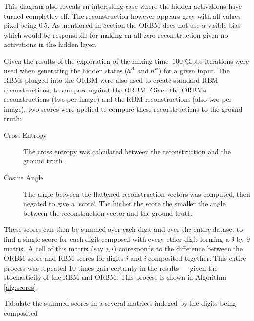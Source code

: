   This diagram also reveals an interesting case where the hidden activations have turned completley off. The reconstruction however appears grey with all values pixel being $0.5$. As mentioned in Section  the ORBM does not use a visible bias which would be responsibile for making an all zero reconstruction given no activations in the hidden layer.


  Given the results of the exploration of the mixing time, 100 Gibbs iterations were used when generating the hidden states ($h^A$ and $h^B$) for a given input. The RBMs plugged into the ORBM were also used to create standard RBM reconstructions, to compare against the ORBM. Given the ORBMs reconstructions (two per image) and the RBM reconstructions (also two per image), two scores were applied to compare these reconstructions to the ground truth:
  \begin{description}
    \item[Cross Entropy] The cross entropy was calculated between the reconstruction and the ground truth.
    \item[Cosine Angle] The angle between the flattened reconstruction vectors was computed, then negated to give a `score`. The higher the score the smaller the angle between the reconstruction vector and the ground truth.
  \end{description}
  These scores can then be summed over each digit and over the entire dataset to find a single score for each digit composed with every other digit forming a 9 by 9 matrix. A cell of this matrix (say $j,i$) corresponds to the difference between the ORBM score and RBM scores for digits $j$ and $i$ composited together. This entire process was repeated 10 times gain certainty in the results --- given the stochasticity of the RBM and ORBM. This process is shown in Algorithm \ref{alg:scores}.

  \begin{algorithm}[!ht]

    {
     Tabulate the summed scores in a several matrices indexed by the digits being composited\;
   }
  \caption{The algorithm explaining how the scores matrices were computed.}\label{alg:scores}
  \end{algorithm}

